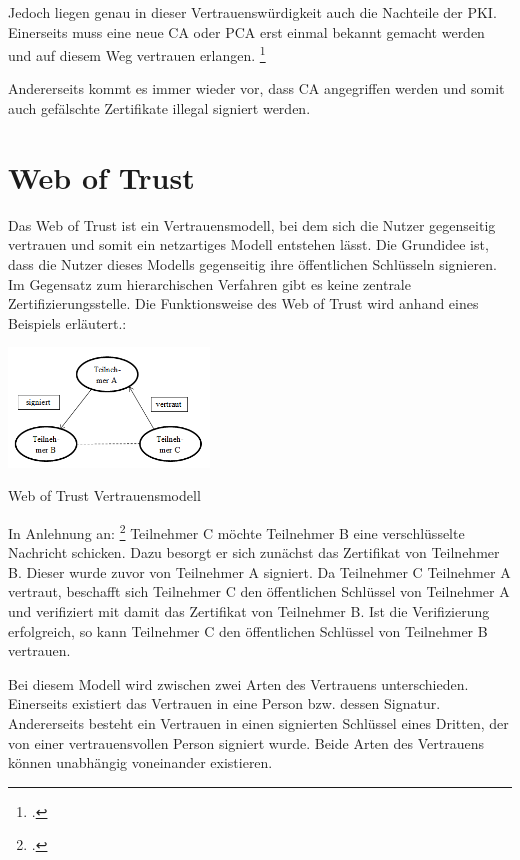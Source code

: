 \documentclass  [paper=a4,
				fontsize=12pt,
				listof=totoc,
				bibliography=totoc
				]{scrreprt}
\begin{document}
			Jedoch liegen genau in dieser Vertrauenswürdigkeit auch die Nachteile der \ac{PKI}. Einerseits muss eine neue \ac{CA} oder \ac{PCA} erst einmal bekannt gemacht werden und auf diesem Weg vertrauen erlangen. \footcite[Vgl.][]{Schwenk, S.24}
			
			Andererseits kommt es immer wieder vor, dass \ac{CA} angegriffen werden und somit auch gefälschte Zertifikate illegal signiert werden.
				
		\section{Web of Trust}
			Das Web of Trust ist ein Vertrauensmodell, bei dem sich die Nutzer gegenseitig vertrauen und somit ein netzartiges Modell entstehen lässt. Die Grundidee ist, dass die Nutzer dieses Modells gegenseitig ihre öffentlichen Schlüsseln signieren. Im Gegensatz zum hierarchischen Verfahren gibt es keine zentrale Zertifizierungsstelle.
			Die Funktionsweise des Web of Trust wird anhand eines Beispiels erläutert.:
			\begin{center}
				\includegraphics[width=0.4\textwidth]{images/WOT.png}
			\end{center}
			\caption[Web of Trust Vertrauensmodell]{Web of Trust Vertrauensmodell\footnotemark}
			In Anlehnung an: \footcite[S. 120]{Ertel2012}
			Teilnehmer C möchte Teilnehmer B eine verschlüsselte Nachricht schicken. Dazu besorgt er sich zunächst das Zertifikat von Teilnehmer B. Dieser wurde zuvor von Teilnehmer A signiert. Da Teilnehmer C Teilnehmer A vertraut, beschafft sich Teilnehmer C den öffentlichen Schlüssel von Teilnehmer A und verifiziert mit damit das Zertifikat von Teilnehmer B. Ist die Verifizierung erfolgreich, so kann Teilnehmer C den öffentlichen Schlüssel von Teilnehmer B vertrauen.
			
			Bei diesem Modell wird zwischen zwei Arten des Vertrauens unterschieden. Einerseits existiert das Vertrauen in eine Person bzw. dessen Signatur. Andererseits besteht ein Vertrauen in einen signierten Schlüssel eines Dritten, der von einer vertrauensvollen Person signiert wurde. Beide Arten des Vertrauens können unabhängig voneinander existieren.
\end{document}
